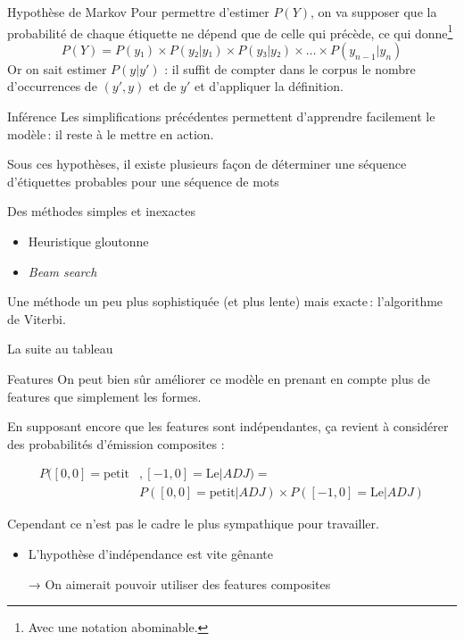 \documentclass[hyperref={unicode}, xcolor={svgnames}, french]{beamer}
\begin{document}

\begin{frame}{Hypothèse de Markov}
	Pour permettre d'estimer $P(Y)$, on va supposer que la probabilité de chaque étiquette ne dépend que de celle qui précède, ce qui donne\footnote{Avec une notation abominable.}
	\begin{equation}
		P(Y) = P(y₁)×P(y₂|y₁)×P(y₃|y₂)×…×P(y_{n-1}|y_n)
	\end{equation}
	Or on sait estimer $P(y|y')$ : il suffit de compter dans le corpus le nombre d'occurrences de $(y',y)$ et de $y'$ et d'appliquer la définition.
\end{frame}

\begin{frame}{Inférence}
	Les simplifications précédentes permettent d'apprendre facilement le modèle : il reste à le mettre en action.

	Sous ces hypothèses, il existe plusieurs façon de déterminer une séquence d'étiquettes probables pour une séquence de mots

	Des méthodes simples et inexactes
	\begin{itemize}
		\item Heuristique gloutonne
		\item \emph{Beam search}
	\end{itemize}

	Une méthode un peu plus sophistiquée (et plus lente) mais exacte : l'algorithme de Viterbi.
\end{frame}


\begin{frame}[standout]
	La suite au tableau
\end{frame}

\begin{frame}{Features}
	On peut bien sûr améliorer ce modèle en prenant en compte plus de features que simplement les formes.

	En supposant encore que les features sont indépendantes, ça revient à considérer des probabilités d'émission composites :

	\begin{equation}
		\begin{split}
			P([0,0]{=}\text{petit}&, [-1,0]{=}\text{Le}|ADJ) =\\
				& P([0,0]{=}\text{petit}|ADJ) × P([-1,0]{=}\text{Le}|ADJ)
		\end{split}
	\end{equation}

	Cependant ce n'est pas le cadre le plus sympathique pour travailler.
	\begin{itemize}
		\item L'hypothèse d'indépendance est vite gênante
		\item[→] On aimerait pouvoir utiliser des features composites
	\end{itemize}
\end{frame}
\end{document}
